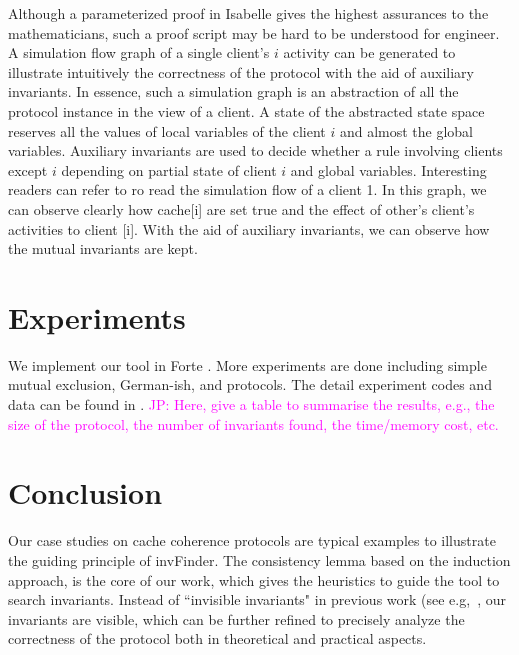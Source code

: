 \documentclass{llncs}
\newcommand\JP[1]{\textcolor{magenta}{JP: #1}}
\begin{document}
Although a parameterized proof in Isabelle gives the highest
assurances to the mathematicians, such a proof script may be hard to
be understood for engineer. A simulation flow graph of a single
client's $i$ activity can be generated to illustrate intuitively the
correctness of the protocol with the aid of auxiliary invariants. In
essence, such a simulation graph is an abstraction of all the
protocol instance in the view of a client. A state of the abstracted
state space reserves all the values of local variables of the client
$i$ and almost the global variables. Auxiliary invariants are used
to decide whether a rule involving clients except $i$ depending on
partial state of client $i$ and global variables. Interesting
readers can refer to \cite{} ro read the simulation flow of a client
1. In this graph, we can observe clearly how cache[i] are set true
and the effect  of other's client's activities to client [i]. With
the aid of auxiliary invariants, we can observe how the mutual
invariants are kept.


\section{Experiments}
We implement our tool in Forte \cite{Forte}. More experiments are
done including simple mutual exclusion, German-ish, and  protocols.
The detail experiment codes and data can be found in \cite{}.
\JP{Here, give a table to summarise the results,
e.g., the size of the protocol, the number of invariants found,
the time/memory cost, etc.}

\section{Conclusion}
Our case studies on cache coherence protocols are typical examples
to illustrate the guiding principle of {\sf invFinder}. The
 consistency lemma based on the induction approach, is the
core of our work, which gives the heuristics to guide the tool
 to search invariants. Instead of ``invisible invariants" in previous work
 (see e.g,~\cite{Pnueli2001}, our invariants are visible,
 which can be further refined to precisely
 analyze the correctness of the protocol both in theoretical and practical aspects.



\end{document}

